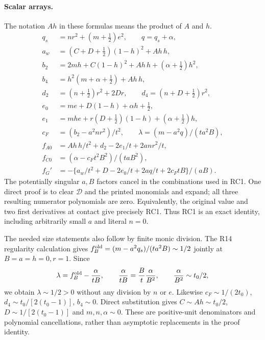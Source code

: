 \paragraph{Scalar arrays.}
The notation $Ah$ in these formulas means the product of $A$ and $h$.
\[
\begin{aligned}
q_s&=nr^2+(m+\tfrac12)e^2,\qquad q=q_s+\alpha,\\
a_w&=(C+D+\tfrac12)(1-h)^2+Ah\,h,\\
b_2&=2mh+C(1-h)^2+Ah\,h+(\alpha+\tfrac12)h^2,\\
b_4&=h^2(m+\alpha+\tfrac12)+Ah\,h,\\
d_2&=(n+\tfrac12)r^2+2Dr,\qquad
d_4=(n+D+\tfrac12)r^2,\\
e_0&=me+D(1-h)+\alpha h+\tfrac12,\\
e_1&=mhe+r(D+\tfrac12)(1-h)+(\alpha+\tfrac12)h,\\
c_F&=(b_2-a^2nr^2)/t^2,\qquad
\lambda=(m-a^2q)/(ta^2B),\\
f_{A0}&=Ah\,h/t^2+d_2-2e_1/t+2anr^2/t,\\
f_{C0}&=(\alpha-c_Ft^2B^2)/(taB^2),\\
f_G'&=-\{a_w/t^2+D-2e_0/t+2aq/t+2c_FtB\}/(aB).
\end{aligned}
\]
The potentially singular $a,B$ factors cancel in the combinations
used in RC1. One direct proof is to clear $\mathcal D$ and the printed
monomials and expand; all three resulting numerator polynomials are
zero. Equivalently, the original value and two first derivatives at
contact give precisely RC1. Thus RC1 is an exact identity, including
arbitrarily small $a$ and literal $n=0$.

The needed size statements also follow by finite monic division.
The R14 regularity calculation gives
$f_B^{\rm old}=(m-a^2q_s)/(ta^2B)\sim1/2$ jointly at
$B=a=h=0,r=1$. Since
\[
\lambda=f_B^{\rm old}-\frac{\alpha}{tB},\qquad
\frac{\alpha}{tB}=\frac Bt\frac{\alpha}{B^2},\qquad
\frac{\alpha}{B^2}\sim t_0/2,
\]
we obtain $\lambda\sim1/2>0$ without any division by $n$ or $e$.
Likewise $c_F\sim1/(2t_0)$, $d_4\sim t_0/[2(t_0-1)]$,
$b_4\sim0$. Direct substitution gives
$C\sim Ah\sim t_0/2$, $D\sim1/[2(t_0-1)]$ and
$m,n,\alpha\sim0$. These are positive-unit denominators and
polynomial cancellations, rather than asymptotic replacements in
the proof identity.

